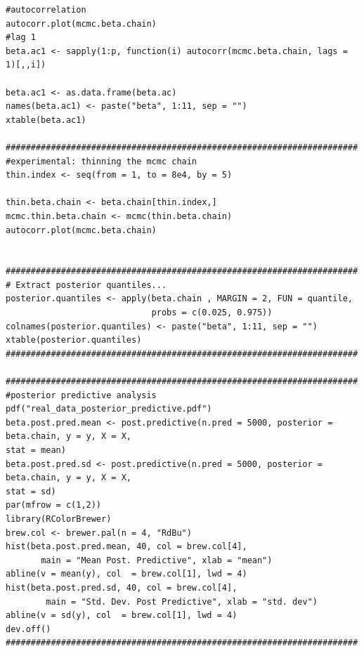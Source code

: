 \documentclass[11pt]{amsart}
\begin{document}
\begin{verbatim}
#autocorrelation
autocorr.plot(mcmc.beta.chain)
#lag 1
beta.ac1 <- sapply(1:p, function(i) autocorr(mcmc.beta.chain, lags = 1)[,,i])

beta.ac1 <- as.data.frame(beta.ac)
names(beta.ac1) <- paste("beta", 1:11, sep = "")
xtable(beta.ac1)

######################################################################
#experimental: thinning the mcmc chain
thin.index <- seq(from = 1, to = 8e4, by = 5)

thin.beta.chain <- beta.chain[thin.index,]
mcmc.thin.beta.chain <- mcmc(thin.beta.chain)
autocorr.plot(mcmc.beta.chain)


######################################################################
# Extract posterior quantiles...
posterior.quantiles <- apply(beta.chain , MARGIN = 2, FUN = quantile, 
                             probs = c(0.025, 0.975))
colnames(posterior.quantiles) <- paste("beta", 1:11, sep = "")
xtable(posterior.quantiles)
######################################################################

######################################################################
#posterior predictive analysis
pdf("real_data_posterior_predictive.pdf")
beta.post.pred.mean <- post.predictive(n.pred = 5000, posterior = beta.chain, y = y, X = X, 
stat = mean)
beta.post.pred.sd <- post.predictive(n.pred = 5000, posterior = beta.chain, y = y, X = X, 
stat = sd)
par(mfrow = c(1,2))
library(RColorBrewer)
brew.col <- brewer.pal(n = 4, "RdBu")
hist(beta.post.pred.mean, 40, col = brew.col[4], 
       main = "Mean Post. Predictive", xlab = "mean")
abline(v = mean(y), col  = brew.col[1], lwd = 4)
hist(beta.post.pred.sd, 40, col = brew.col[4], 
        main = "Std. Dev. Post Predictive", xlab = "std. dev")
abline(v = sd(y), col  = brew.col[1], lwd = 4)
dev.off()
######################################################################


\end{verbatim}
\end{document}
